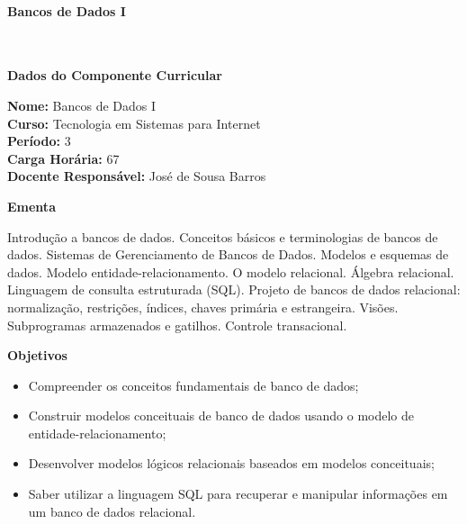 \paragraph{Bancos de Dados I} \


\begin{snugshade}\begin{center}\textbf{
	Dados do Componente Curricular
}\end{center}\end{snugshade}

\noindent 	\textbf{Nome:} Bancos de Dados I
\\ 			\textbf{Curso:} Tecnologia em Sistemas para Internet
\\ 			\textbf{Período:} \unit{3}{\degree}
\\ 			\textbf{Carga Horária:} \unit{67}{\hour}
\\ 			\textbf{Docente Responsável:} José de Sousa Barros 


\begin{snugshade}\begin{center}\textbf{
    Ementa
\vphantom{q}}\end{center}\end{snugshade}

\noindent
Introdução a bancos de dados. Conceitos básicos e terminologias de bancos de dados. Sistemas de Gerenciamento de Bancos de Dados. Modelos e esquemas de dados. Modelo entidade-relacionamento. O modelo relacional. Álgebra relacional. Linguagem de consulta estruturada (SQL). Projeto de bancos de dados relacional: normalização, restrições, índices, chaves primária e estrangeira. Visões. Subprogramas armazenados e gatilhos. Controle transacional.


\begin{snugshade}\begin{center}\textbf{
    Objetivos
}\end{center}\end{snugshade}


\begin{itemize}

\item Compreender os conceitos fundamentais de banco de dados;
\item Construir modelos conceituais de banco de dados usando o modelo de entidade-relacionamento;
\item Desenvolver modelos lógicos relacionais baseados em modelos conceituais;
\item Saber utilizar a linguagem SQL para recuperar e manipular informações em um banco de dados relacional.

\end{itemize}

